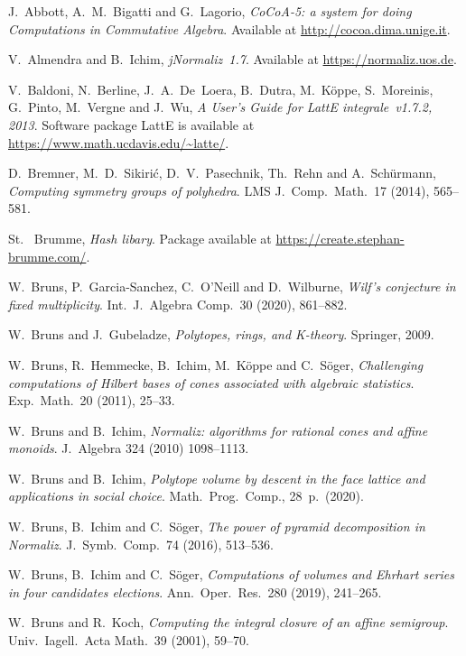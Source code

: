 \documentclass[12pt,a4paper]{scrartcl}
\theoremstyle{definition}
\begin{document}
\begin{thebibliography}{15.}
\small

J.~Abbott, A.~M.~Bigatti and G.~Lagorio,
\emph{CoCoA-5: a system for doing Computations in Commutative Algebra}.
Available at \url{http://cocoa.dima.unige.it}.

V.~Almendra and B.~Ichim,
\emph{jNormaliz~1.7}.
Available at \url{https://normaliz.uos.de}.

V.~Baldoni, N.~Berline, J.~A.~De~Loera, B.~Dutra,
M.~K\"oppe, S.~Moreinis, G.~Pinto, M.~Vergne and J.~Wu,
\emph{A User's Guide for LattE integrale~v1.7.2, 2013}.
Software package LattE is available at \url{https://www.math.ucdavis.edu/~latte/}.

D.~Bremner, M.~D.~Sikiri\'c, D.~V.~Pasechnik, Th.~Rehn and A.~Sch\"urmann,
\emph{Computing symmetry groups of polyhedra}.
LMS J.\ Comp.\ Math.\ 17 (2014), 565--581.

St.~ Brumme,
\emph{Hash libary}.
Package available at \url{https://create.stephan-brumme.com/}.

W.~Bruns, P.~Garcia-Sanchez, C.~O'Neill and D.~Wilburne,
\emph{Wilf's conjecture in fixed multiplicity}.
Int.\ J.\ Algebra Comp.\ 30 (2020), 861--882.

W.~Bruns and J.~Gubeladze,
\emph{Polytopes, rings, and K-theory}.
Springer, 2009.

W.~Bruns, R.~Hemmecke, B.~Ichim, M.~K\"oppe and C.~S\"oger,
\emph{Challenging computations of Hilbert bases of cones associated with algebraic statistics}.
Exp.\ Math.\ 20 (2011), 25--33.

W.~Bruns and B.~Ichim,
\emph{Normaliz: algorithms for rational cones and affine monoids}.
J.\ Algebra 324 (2010) 1098--1113.

W.~Bruns and B.~Ichim,
\emph{Polytope volume by descent in the face lattice and applications in social choice}.
Math.\ Prog.\ Comp., 28~p.\ (2020).

W.~Bruns, B.~Ichim and C.~S\"oger,
\emph{The power of pyramid decomposition in Normaliz}.
J.\ Symb.\ Comp.\ 74 (2016), 513--536.

W.~Bruns, B.~Ichim and C.~S\"oger,
\emph{Computations of volumes and Ehrhart series in four candidates elections}.
Ann.\ Oper.\ Res.\ 280 (2019), 241--265.

W.~Bruns and R.~Koch,
\emph{Computing the integral closure of an affine semigroup}.
Univ.\ Iagell.\ Acta Math.\ 39 (2001), 59--70.


\end{thebibliography}
\end{document}
